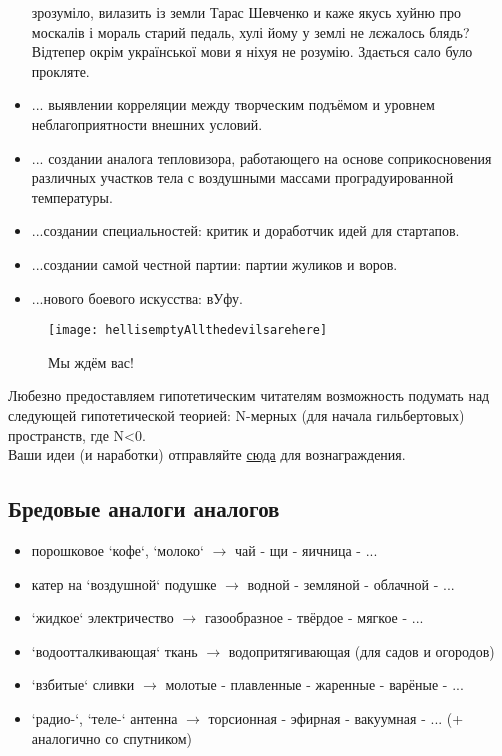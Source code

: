 \begin{itemize}
{            зрозуміло, вилазить із земли Тарас Шевченко и каже якусь хуйню про москалів і мораль старий педаль, 
            хулі йому у землі не лєжалось блядь? Відтепер окрім української мови я ніхуя не розумію. Здається 
            сало було прокляте.}
    \item ... выявлении корреляции между творческим подъёмом и уровнем неблагоприятности внешних условий.
    \item ... создании аналога тепловизора, работающего на основе соприкосновения различных участков тела с воздушными массами проградуированной температуры.
    \item ...создании специальностей: критик и доработчик идей для стартапов.
    \item ...создании самой честной партии: партии жуликов и воров.
    \item ...нового боевого искусства: вУфу.
\end{itemize}
\begin{figure}[ht!]
    \centering
    \texttt{[image: hellisemptyAllthedevilsarehere]}
    \caption{Мы ждём вас!}
\end{figure}

Любезно предоставляем гипотетическим читателям возможность подумать над следующей гипотетической теорией:
N-мерных (для начала гильбертовых) пространств, где N<0.\\
Ваши идеи (и наработки) отправляйте \href{http://www.abelprize.no/}{сюда} для вознаграждения.

\subsection{Бредовые аналоги аналогов}
\begin{itemize}
\item порошковое `кофе`, `молоко` \( \to \) чай - щи - яичница - ...
\item катер на `воздушной` подушке \( \to \) водной - земляной - облачной - ...
\item `жидкое` электричество \( \to \) газообразное - твёрдое - мягкое - ...
\item `водоотталкивающая` ткань \( \to \) водопритягивающая (для садов и огородов)
\item `взбитые` сливки \( \to \) молотые - плавленные - жаренные - варёные - ...
\item `радио-`, `теле-` антенна \( \to \) торсионная - эфирная - вакуумная - ... (+ аналогично со спутником)
\end{itemize}
